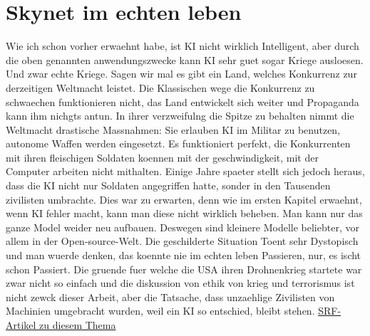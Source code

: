 \documentclass{report}
\begin{document}
\section{Skynet im echten leben}
Wie ich schon vorher erwaehnt habe, ist KI nicht wirklich Intelligent, aber durch die oben genannten anwendungszwecke kann KI sehr guet sogar Kriege ausloesen. Und zwar echte Kriege.
\newline
Sagen wir mal es gibt ein Land, welches Konkurrenz zur derzeitigen Weltmacht leistet. Die Klassischen wege die Konkurrenz zu schwaechen funktionieren nicht, das Land entwickelt sich weiter und Propaganda kann ihm nichgts antun. In ihrer verzweifulng die Spitze zu behalten nimmt die Weltmacht drastische Massnahmen: Sie erlauben KI im Militar zu benutzen, autonome Waffen werden eingesetzt. Es funktioniert perfekt, die Konkurrenten mit ihren fleischigen Soldaten koennen mit der geschwindigkeit, mit der Computer arbeiten nicht mithalten. Einige Jahre spaeter stellt sich jedoch heraus, dass die KI nicht nur Soldaten angegriffen hatte, sonder in den Tausenden zivilisten umbrachte. Dies war zu erwarten, denn wie im ersten Kapitel erwaehnt, wenn KI fehler macht, kann man diese nicht wirklich beheben. Man kann nur das ganze Model weider neu aufbauen. Deswegen sind kleinere Modelle beliebter, vor allem in der Open-source-Welt.
\newline
\newline
Die geschilderte Situation Toent sehr Dystopisch und man wuerde denken, das koennte nie im echten leben Passieren, nur, es ischt schon Passiert. Die gruende fuer welche die USA ihren Drohnenkrieg startete war zwar nicht so einfach und die diskussion von ethik von krieg und terrorismus ist nicht zewck dieser Arbeit, aber die Tatsache, dass unzaehlige Zivilisten von Machinien umgebracht wurden, weil ein KI so entschied, bleibt stehen.
\newline
\hyperlink{https://www.srf.ch/news/international/tausende-zivile-opfer-der-schmutzige-drohnenkrieg-der-usa}{SRF-Artikel zu diesem Thema}
\printbibliography
\end{document}
